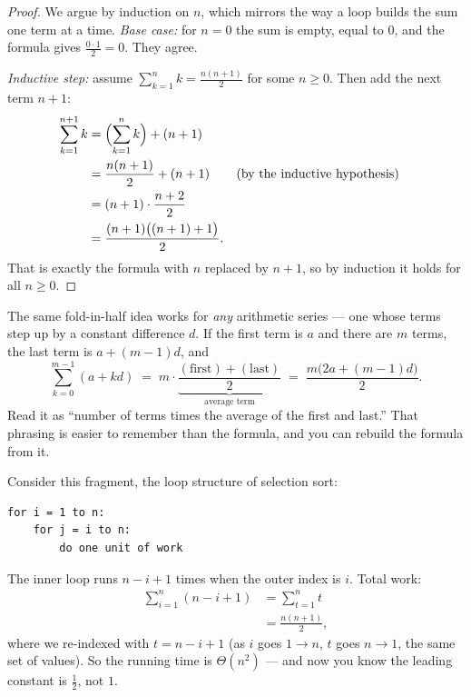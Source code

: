 \begin{proof}
We argue by induction on $n$, which mirrors the way a loop builds the sum one
term at a time. \emph{Base case:} for $n=0$ the sum is empty, equal to $0$, and
the formula gives $\tfrac{0\cdot 1}{2}=0$. They agree.

\emph{Inductive step:} assume $\sum_{k=1}^{n} k = \tfrac{n(n+1)}{2}$ for some
$n \ge 0$. Then add the next term $n+1$:
\begin{align*}
  \sum_{k=1}^{n+1} k
    &= \Bigl(\sum_{k=1}^{n} k\Bigr) + (n+1) \\
    &= \frac{n(n+1)}{2} + (n+1) &&\text{(by the inductive hypothesis)} \\
    &= (n+1)\cdot\frac{n + 2}{2} \\
    &= \frac{(n+1)\bigl((n+1)+1\bigr)}{2}.
\end{align*}
That is exactly the formula with $n$ replaced by $n+1$, so by induction it holds
for all $n \ge 0$.
\end{proof}

The same fold-in-half idea works for \emph{any} arithmetic series --- one whose
terms step up by a constant difference $d$. If the first term is $a$ and there are
$m$ terms, the last term is $a + (m-1)d$, and
\[
  \sum_{k=0}^{m-1}(a + kd)
    \;=\; m\cdot\underbrace{\frac{(\text{first}) + (\text{last})}{2}}_{\text{average term}}
    \;=\; \frac{m\bigl(2a + (m-1)d\bigr)}{2}.
\]
Read it as ``number of terms times the average of the first and last.'' That
phrasing is easier to remember than the formula, and you can rebuild the
formula from it.

\begin{example}
\label{ch37:ex-nested}
Consider this fragment, the loop structure of selection sort:
\begin{verbatim}
for i = 1 to n:
    for j = i to n:
        do one unit of work
\end{verbatim}
The inner loop runs $n - i + 1$ times when the outer index is $i$. Total work:
\begin{align*}
  \sum_{i=1}^{n}(n - i + 1)
    &= \sum_{t=1}^{n} t \\
    &= \frac{n(n+1)}{2},
\end{align*}
where we re-indexed with $t = n - i + 1$ (as $i$ goes $1\to n$, $t$ goes
$n\to 1$, the same set of values). So the running time is
$\Theta(n^2)$ --- and now you know the leading constant is $\tfrac12$, not $1$.
\end{example}

